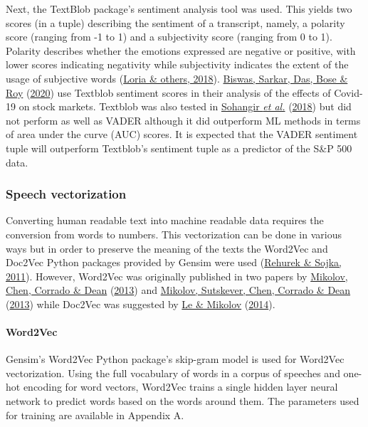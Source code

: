 \documentclass[11pt,preprint, authoryear]{elsarticle}
\numberwithin{equation}{section}
\numberwithin{figure}{section}
\numberwithin{table}{section}
\begin{document}
Next, the TextBlob package's sentiment analysis tool was used. This
yields two scores (in a tuple) describing the sentiment of a transcript,
namely, a polarity score (ranging from -1 to 1) and a subjectivity score
(ranging from 0 to 1). Polarity describes whether the emotions expressed
are negative or positive, with lower scores indicating negativity while
subjectivity indicates the extent of the usage of subjective words
(\protect\hyperlink{ref-loria2018textblob}{Loria \& others, 2018}).
\protect\hyperlink{ref-biswas2020examining}{Biswas, Sarkar, Das, Bose \&
Roy} (\protect\hyperlink{ref-biswas2020examining}{2020}) use Textblob
sentiment scores in their analysis of the effects of Covid-19 on stock
markets. Textblob was also tested in
\protect\hyperlink{ref-sohangir2018financial}{Sohangir \emph{et al.}}
(\protect\hyperlink{ref-sohangir2018financial}{2018}) but did not
perform as well as VADER although it did outperform ML methods in terms
of area under the curve (AUC) scores. It is expected that the VADER
sentiment tuple will outperform Textblob's sentiment tuple as a
predictor of the S\&P 500 data.

\hypertarget{speech-vectorization}{%
\subsubsection{Speech vectorization}\label{speech-vectorization}}

Converting human readable text into machine readable data requires the
conversion from words to numbers. This vectorization can be done in
various ways but in order to preserve the meaning of the texts the
Word2Vec and Doc2Vec Python packages provided by Gensim were used
(\protect\hyperlink{ref-rehurek2011gensim}{Rehurek \& Sojka, 2011}).
However, Word2Vec was originally published in two papers by
\protect\hyperlink{ref-mikolov2013efficient}{Mikolov, Chen, Corrado \&
Dean} (\protect\hyperlink{ref-mikolov2013efficient}{2013}) and
\protect\hyperlink{ref-mikolov2013distributed}{Mikolov, Sutskever, Chen,
Corrado \& Dean} (\protect\hyperlink{ref-mikolov2013distributed}{2013})
while Doc2Vec was suggested by
\protect\hyperlink{ref-le2014distributed}{Le \& Mikolov}
(\protect\hyperlink{ref-le2014distributed}{2014}).

\hypertarget{word2vec}{%
\paragraph{Word2Vec}\label{word2vec}}

Gensim's Word2Vec Python package's skip-gram model is used for Word2Vec
vectorization. Using the full vocabulary of words in a corpus of
speeches and one-hot encoding for word vectors, Word2Vec trains a single
hidden layer neural network to predict words based on the words around
them. The parameters used for training are available in Appendix A.
\end{document}
